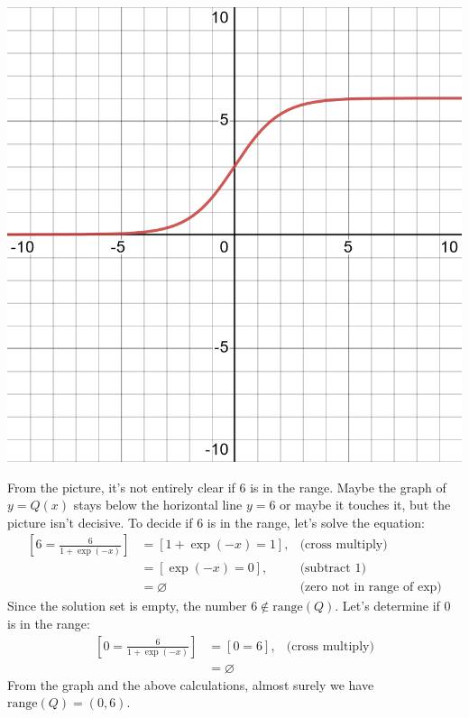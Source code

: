 \documentclass[12pt,fleqn,answers]{exam}
\newcommand{\range}{\mbox{range}}
\begin{document}
\begin{questions}
\begin{solution}[3.5in]
\begin{center}
\includegraphics[scale=0.15]{desmos-graph(26).png}
\end{center}
From the picture, it's not entirely clear if $6$ is in the range. Maybe the graph of $y=Q(x)$ stays below the horizontal line
$y=6$ or maybe it touches it, but the picture isn't decisive. To decide if $6$ is in the range, let's solve the equation:
\begin{align*}
    \left[ 6 = \frac{6}{1+\exp(-x)} \right] &= \left[1+\exp(-x) = 1 \right], 
                                            &\mbox{(cross multiply)}\\
                                            &= \left[\exp(-x) = 0 \right], 
                                            &\mbox{(subtract 1)}\\
                                            &= \varnothing  &\mbox{(zero not in range of $\exp$)}
\end{align*}
Since the solution set is empty, the number $6 \notin \range(Q)$.  Let's determine
if $0$ is in the range:
\begin{align*}
    \left[ 0 = \frac{6}{1+\exp(-x)} \right] &= \left[ 0 = 6 \right], 
                                            &\mbox{(cross multiply)}\\
                                            &= \varnothing  
\end{align*}
From the graph and the above calculations, almost surely we have $\range(Q) = (0,6)$. 


\end{solution}
\end{questions}
\end{document}
